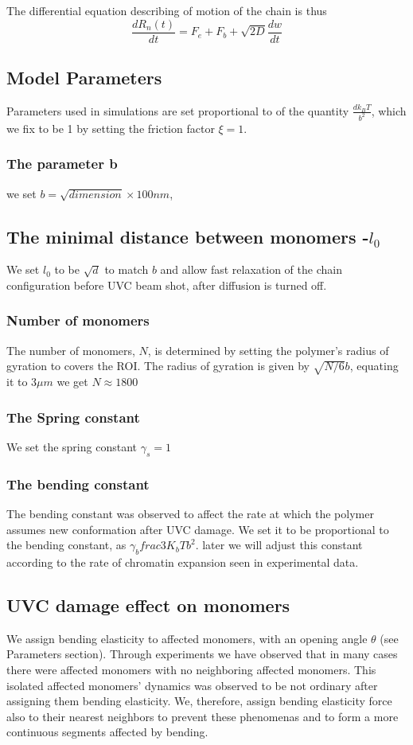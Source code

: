\documentclass[12pt]{report}
\begin{document}
     The differential equation describing of motion of the chain is thus 
     \begin{equation*}
     \frac{dR_n(t)}{dt}= F_e +F_b +\sqrt{2D} \frac{dw}{dt}     
     \end{equation*}
     
    \subsection{Model Parameters}
      Parameters used in simulations are set proportional to of the quantity $\frac{dk_BT}{b^2}$, which we fix to be 1 by setting the friction factor $\xi=1$. 
    \subsubsection{The parameter b} 
      we set $b=\sqrt{dimension} \times 100 nm$, 
    \subsection{The minimal distance between monomers -$l_0$}
     We set $l_0$ to be $\sqrt{d}$ to match $b$ and allow fast relaxation of the chain configuration before UVC beam shot, after diffusion is turned off. 
    \subsubsection{Number of monomers}
      The number of monomers, $N$, is determined by setting the polymer's radius of gyration to covers the ROI. The radius of gyration is given by $\sqrt{N/6}b$, equating it to $3\mu m$ we get $N\approx 1800$                      
     \subsubsection{The Spring constant}
       We set the spring constant $\gamma_s =1$
     \subsubsection{The bending constant}       
       The bending constant was observed to affect the rate at which the polymer assumes new conformation after UVC damage.
       We set it to be proportional to the bending constant, as $\gamma_b frac{3K_bT}{b^2}$. later we will adjust this constant according to the rate of chromatin expansion seen in experimental data. 
             
      \subsection{UVC damage effect on monomers}
       We assign bending elasticity to affected monomers, with an opening angle $\theta$ (see Parameters section). Through experiments we have observed that in many cases there were affected monomers with no neighboring affected monomers. This isolated affected monomers' dynamics was observed to be not ordinary after assigning them bending elasticity. We, therefore, assign bending elasticity force also to their nearest neighbors to prevent these phenomenas and to form a more continuous segments affected by bending. 
       
\end{document}
